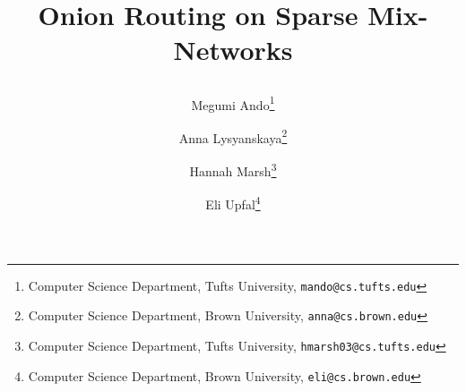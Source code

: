 \newif \iftheory 

\theorytrue %

\newif \ifblind

\blindtrue \blindfalse

\newcommand{\eli}[1]{\textcolor{blue}{[Eli: #1]}}
\newcommand{\meg}[1]{\textcolor{red}{[Megumi: #1]}}
\newcommand{\hannah}[1]{\textcolor{magenta}{[Hannah: #1]}}


\newcommand{\authorlist}{
Megumi Ando\iftheory\thanks{Computer Science Department, Tufts University, {\tt mando@cs.tufts.edu}}\fi
\and 
Anna Lysyanskaya\iftheory\thanks{Computer Science Department, Brown University, {\tt anna@cs.brown.edu}}\fi
\and 
Hannah Marsh\iftheory\thanks{Computer Science Department, Tufts University, {\tt hmarsh03@cs.tufts.edu}}\fi
\and
Eli Upfal\iftheory\thanks{Computer Science Department, Brown University, {\tt eli@cs.brown.edu}}\fi
}

\newcommand{\institutelist}{}


\newcommand{\titlelist}{\iftheory\begin{bf}\fi
Onion Routing on Sparse Mix-Networks
\iftheory\end{bf}\fi}

\newcommand{\pathstyles}{./stylefiles}

\newcommand{\pathpreambles}{./preambles}

\newcommand{\pathbibs}{./bibfiles}



\iftheory
\documentclass[11pt]{article}

\else
\documentclass[runningheads,a4paper]{llncs}
\ifblind 
\institute{}
\else
\institute{\institutelist}
\fi
\fi

\ifblind 
\author{}
\else
\author{\authorlist} 
\fi
\pagestyle{plain}

\title{\titlelist}






\maketitle
\iftheory
\thispagestyle{empty}
\fi

